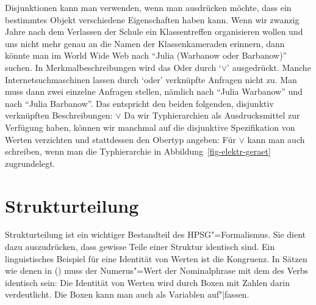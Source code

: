 Disjunktionen kann man verwenden, wenn man ausdrücken möchte, dass ein bestimmtes Objekt
verschiedene Eigenschaften haben kann. Wenn wir \zb zwanzig Jahre nach dem Verlassen der Schule
ein Klassentreffen organisieren wollen und uns nicht mehr genau an die Namen der Klassenkameraden erinnern,
dann könnte man im World Wide Web nach "`Julia (Warbanow oder Barbanow)"' suchen.
In Merkmalbeschreibungen wird das Oder durch `$\vee$'\is{$\vee$} ausgedrückt.
\ea
{}
\z
Manche Internetsuchmaschinen lassen durch `oder' verknüpfte Anfragen nicht zu. Man muss
dann zwei einzelne Anfragen stellen, nämlich nach "`Julia Warbanow"' und nach "`Julia
Barbanow"'. Das entspricht den beiden folgenden, disjunktiv verknüpften Beschreibungen: 
\ea
{} $\vee $
\z
Da wir Typhierarchien als Ausdrucksmittel zur Verfügung haben, können wir manchmal auf die
disjunktive Spezifikation von Werten verzichten und stattdessen den Obertyp angeben:
Für  $\vee$  kann man auch  schreiben,
wenn man die Typhierarchie in Abbildung~\vref{fig-elektr-geraet} zugrundelegt.%

\section{Strukturteilung}
\label{sec-strukturteilung}

Strukturteilung ist ein wichtiger Bestandteil des HPSG"=Formalismus. Sie dient
dazu auszudrücken, dass gewisse Teile einer Struktur identisch sind. Ein linguistisches
Beispiel für eine Identität von Werten ist die Kongruenz. In Sätzen wie denen in ()
muss der Numerus"=Wert der Nominalphrase mit dem des Verbs identisch sein:
\eal
{}
\zl
Die Identität von Werten wird durch Boxen mit Zahlen darin verdeutlicht.
Die Boxen kann man auch als Variablen auf"|fassen.

